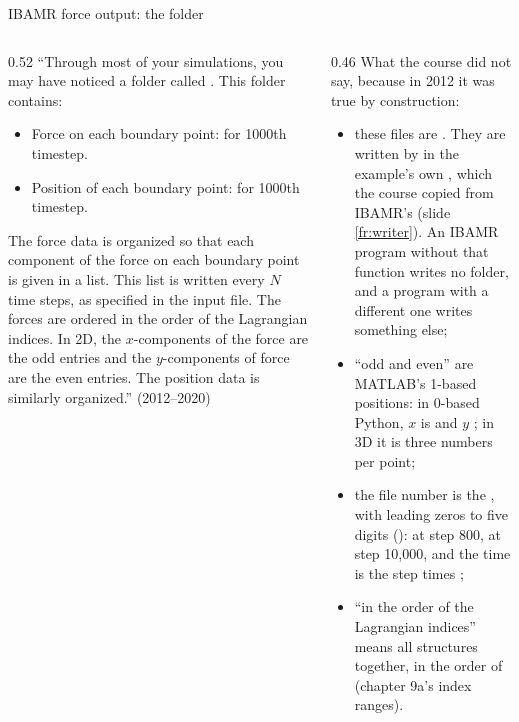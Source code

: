 \documentclass[aspectratio=169,11pt]{beamer}
\begin{document}
\begin{frame}{IBAMR force output: the  folder}
\label{fr:folder}
\begin{columns}[T,onlytextwidth]
\begin{column}{0.52\textwidth}
\small ``Through most of your simulations, you may have noticed a folder called . This folder contains:
\begin{itemize}
  \item Force on each boundary point:  for 1000th timestep.
  \item Position of each boundary point:  for 1000th timestep.
\end{itemize}
The force data is organized so that each component of the force on each boundary point is given in a list. This list is written every $N$ time steps, as specified in the input file. The forces are ordered in the order of the Lagrangian indices. In 2D, the $x$-components of the force are the odd entries and the $y$-components of force are the even entries. The position data is similarly organized.'' (2012--2020)
\end{column}
\begin{column}{0.46\textwidth}
\scriptsize What the course did not say, because in 2012 it was true by construction:
\begin{itemize}
  \item these files are . They are written by  in the example's own , which the course copied from IBAMR's  (slide \ref{fr:writer}). An IBAMR program without that function writes no  folder, and a program with a different one writes something else;
  \item ``odd and even'' are MATLAB's 1-based positions: in 0-based Python, $x$ is \code{[0::2]} and $y$ \code{[1::2]}; in 3D it is three numbers per point;
  \item the file number is the , with leading zeros to five digits ():  at step 800,  at step 10,000, and the time is the step times ;
  \item ``in the order of the Lagrangian indices'' means all structures together, in the order of  (chapter 9a's index ranges).
\end{itemize}
\end{column}
\end{columns}
\end{frame}
\end{document}
